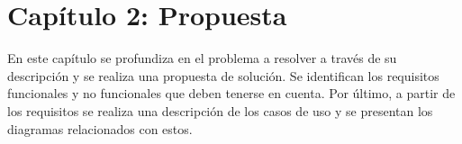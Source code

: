%
%
%

\section*{Capítulo 2: Propuesta}
En este capítulo se profundiza en el problema a resolver a través de su descripción y se realiza una propuesta de solución. Se identifican los requisitos funcionales y no funcionales que deben tenerse en cuenta. Por último, a partir de los requisitos se realiza una descripción de los casos de uso y se presentan los diagramas relacionados con estos.

%
%
 

